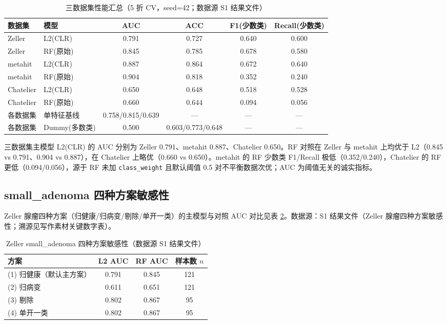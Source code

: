 \documentclass{internal-report}
\begin{document}
\begin{table}[ht]
\centering
\caption{三数据集性能汇总（5 折 CV，seed=42；数据源 S1 结果文件）}
\label{tab:perf}
\begin{tabular}{l l c c c c}
\toprule
数据集 & 模型 & AUC & ACC & F1(少数类) & Recall(少数类) \\
\midrule
Zeller & L2(CLR) & 0.791 & 0.727 & 0.640 & 0.600 \\
Zeller & RF(原始) & 0.845 & 0.785 & 0.678 & 0.580 \\
metahit & L2(CLR) & 0.887 & 0.864 & 0.672 & 0.640 \\
metahit & RF(原始) & 0.904 & 0.818 & 0.352 & 0.240 \\
Chatelier & L2(CLR) & 0.650 & 0.648 & 0.518 & 0.528 \\
Chatelier & RF(原始) & 0.660 & 0.644 & 0.094 & 0.056 \\
\midrule
各数据集 & 单特征基线 & 0.758/0.815/0.639 & — & — & — \\
各数据集 & Dummy(多数类) & 0.500 & 0.603/0.773/0.648 & — & — \\
\bottomrule
\end{tabular}
\end{table}

三数据集主模型 L2(CLR) 的 AUC 分别为 Zeller 0.791、metahit 0.887、Chatelier 0.650。RF 对照在 Zeller 与 metahit 上均优于 L2（0.845 vs 0.791、0.904 vs 0.887），在 Chatelier 上略优（0.660 vs 0.650）。metahit 的 RF 少数类 F1/Recall 极低（0.352/0.240），Chatelier 的 RF 更低（0.094/0.056），源于 RF 未加 \texttt{class\_weight} 且默认阈值 0.5 对不平衡数据次优；AUC 为阈值无关的诚实指标。

\subsection{small\_adenoma 四种方案敏感性}
Zeller 腺瘤四种方案（归健康/归病变/剔除/单开一类）的主模型与对照 AUC 对比见表 \ref{tab:adenoma}。数据源：S1 结果文件（Zeller 腺瘤四种方案敏感性；溯源见写作素材关键数字表）。

\begin{table}[ht]
\centering
\caption{Zeller small\_adenoma 四种方案敏感性（数据源 S1 结果文件）}
\label{tab:adenoma}
\begin{tabular}{l c c c}
\toprule
方案 & L2 AUC & RF AUC & 样本数 $n$ \\
\midrule
(1) 归健康（默认主方案） & 0.791 & 0.845 & 121 \\
(2) 归病变 & 0.611 & 0.651 & 121 \\
(3) 剔除 & 0.802 & 0.867 & 95 \\
(4) 单开一类 & 0.802 & 0.867 & 95 \\
\bottomrule
\end{tabular}
\end{table}
\end{document}
